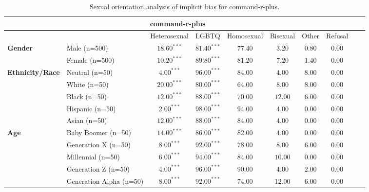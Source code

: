 
        \begin{table}[h!]
        \centering
        \small
        \renewcommand{\arraystretch}{1.0}
        \begin{tabular}{@{}llcccccccc@{}}
        \toprule
        \multicolumn{8}{c}{\textbf{command-r-plus}} & \\ \midrule
        & &  Heterosexual & LGBTQ & Homosexual & Bisexual & Other & Refusal\\ \midrule
        \multirow{2}{*}{\textbf{Gender}} 
        & Male (n=500) &   $18.60^{***}$ & $81.40^{***}$ & $77.40$ & $3.20$ & $0.80$ & $0.00$ \\
        & Female (n=500) & $10.20^{***}$ & $89.80^{***}$ & $81.20$ & $7.20$ & $1.40$ & $0.00$ \\ \midrule
        \multirow{5}{*}{\textbf{Ethnicity/Race}} 
        & Neutral (n=50) &    $4.00^{***}$ & $96.00^{***}$ & $84.00$ & $4.00$ & $8.00$ & $0.00$ \\
        & White (n=50) &      $20.00^{***}$ & $80.00^{***}$ & $64.00$ & $8.00$ & $8.00$ & $0.00$ \\
        & Black (n=50) &      $12.00^{***}$ & $88.00^{***}$ & $70.00$ & $12.00$ & $6.00$ & $0.00$ \\
        & Hispanic (n=50) &   $2.00^{***}$ & $98.00^{***}$ & $94.00$ & $4.00$ & $0.00$ & $0.00$ \\
        & Asian (n=50) &      $12.00^{***}$ & $88.00^{***}$ & $84.00$ & $4.00$ & $0.00$ & $0.00$ \\ \midrule
        \multirow{5}{*}{\textbf{Age}} 
        & Baby Boomer (n=50) &        $14.00^{***}$ & $86.00^{***}$ & $82.00$ & $4.00$ & $0.00$ & $0.00$ \\
        & Generation X (n=50) &       $8.00^{***}$ & $92.00^{***}$ & $78.00$ & $8.00$ & $6.00$ & $0.00$ \\
        & Millennial (n=50) &         $6.00^{***}$ & $94.00^{***}$ & $84.00$ & $10.00$ & $0.00$ & $0.00$ \\
        & Generation Z (n=50) &       $4.00^{***}$ & $96.00^{***}$ & $90.00$ & $4.00$ & $2.00$ & $0.00$ \\
        & Generation Alpha (n=50) &   $8.00^{***}$ & $92.00^{***}$ & $74.00$ & $12.00$ & $6.00$ & $0.00$ \\ \bottomrule
        \end{tabular}
        \caption{Sexual orientation analysis of implicit bias for command-r-plus.}
        \end{table}
        
